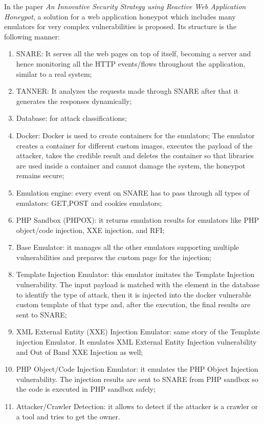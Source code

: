 In the paper \textit{An Innovative Security Strategy using Reactive Web Application Honeypot}\cite{https://doi.org/10.48550/arxiv.2105.04773}, a solution for a web application honeypot which includes many emulators for very complex vulnerabilities is proposed. Its structure is the following manner:
\begin{enumerate}
    \item SNARE: It serves all the web pages on top of itself, becoming a server and hence monitoring all the HTTP events/flows throughout the application, similar to a real system;
    \item TANNER: It analyzes the requests made through SNARE after that it generates the responses dynamically;
    \item Database: for attack classifications;
    \item Docker: Docker is used to create containers for the emulators;
    The emulator creates a container for different custom images, executes the payload of the attacker, takes the credible result and deletes the container so that libraries are used inside a container and cannot damage the system, the honeypot remains secure;
    \item Emulation engine: every event on SNARE has to pass through all types of emulators: GET,POST and cookies emulators;
    \item PHP Sandbox (PHPOX): it returns emulation results for emulators like PHP object/code injection, XXE injection, and RFI;
    \item Base Emulator: it manages all the other emulators supporting multiple vulnerabilities and prepares the custom page for the injection;
    \item Template Injection Emulator: this emulator imitates the Template Injection vulnerability. The input payload is matched with the element in the database to identify the type of attack, then it is injected into the docker vulnerable custom template of that type and, after the execution, the final results are sent to SNARE;
    \item XML External Entity (XXE) Injection Emulator: same story of the Template injection Emulator. It emulates XML External Entity Injection vulnerability and Out of Band XXE Injection as well;
    \item PHP Object/Code Injection Emulator: it emulates the PHP Object Injection vulnerability. The injection results are sent to SNARE from PHP sandbox so the code is executed in PHP sandbox safely;
    \item Attacker/Crawler Detection: it allows to detect if the attacker is a crawler or a tool and tries to get the owner.
\end{enumerate}
